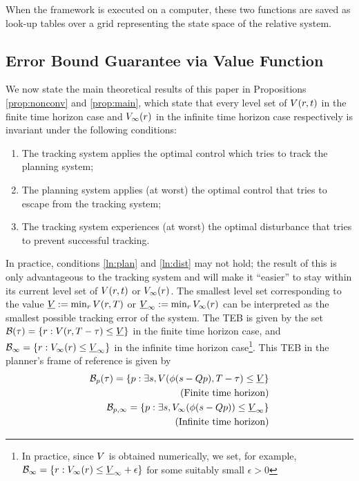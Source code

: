 When the framework is executed on a computer, these two functions are saved as look-up tables over a grid representing the state space of the relative system.
 
\subsection{Error Bound Guarantee via Value Function} \label{sec:proofs}
We now state the main theoretical results of this paper in Propositions \ref{prop:nonconv} and \ref{prop:main}, which state that every level set of $V(r, t)$ in the finite time horizon case and $V_\infty(r)$ in the infinite time horizon case respectively is invariant under the following conditions:
\begin{enumerate}
  \item The tracking system applies the optimal control which tries to track the planning system;
  \item The planning system applies (at worst) the optimal control that tries to escape from the tracking system; \label{ln:plan}
  \item The tracking system experiences (at worst) the optimal disturbance that tries to prevent successful tracking. \label{ln:dist}
\end{enumerate}
In practice, conditions \ref{ln:plan} and \ref{ln:dist} may not hold; the result of this is only advantageous to the tracking system and will make it ``easier'' to stay within its current level set of $V(r, t)$ or $V_\infty(r)$. 
The smallest level set corresponding to the value $\underline{V} := \min_{r} V(r,T)$ or $\underline{V}_\infty := \min_{r} V_\infty(r)$ can be interpreted as the smallest possible tracking error of the system. 
The TEB is given by the set $\mathcal B(\tau) = \{r: V(r, T - \tau) \le \underline{V}\}$ in the finite time horizon case, and $\mathcal B_\infty = \{r: V_\infty(r) \le \underline{V}_\infty\}$ in the infinite time horizon case\footnote{In practice, since $V$ is obtained numerically, we set, for example, $\mathcal B_\infty = \{r: V_\infty(r) \le \underline{V}_\infty + \epsilon\}$ for some suitably small $\epsilon>0$}. 
This TEB in the planner's frame of reference is given by
\begin{subequations} \label{eq:TEBp}
  \begin{align} 
  \TEB_\pstate(\tau) = \{\pstate: \exists s, \valfunc(\rtrans(\tstate-\ptmat\pstate), \thor-\tau) \le \underline\valfunc\}\label{eq:TEBp:inf} \\
  \quad \text{(Finite time horizon)} \nonumber\\
  \TEB_{\pstate, \infty} = \{\pstate: \exists s, \valfunc_\infty(\rtrans(\tstate-\ptmat\pstate)) \le \underline\valfunc_\infty\} \label{eq:TEBp:fin} \\
  \quad \text{(Infinite time horizon)} \nonumber
  \end{align}
\end{subequations}

